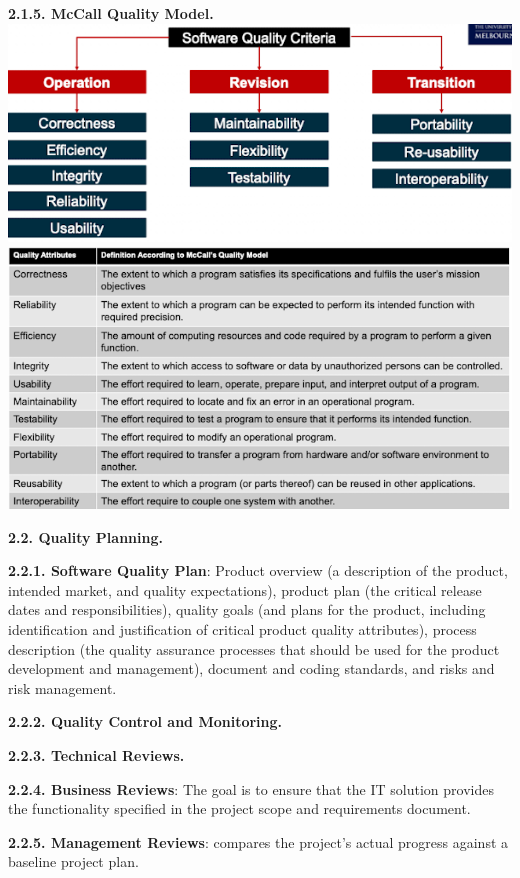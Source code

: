         \textbf{2.1.5. McCall Quality Model.}
        \includegraphics[width=\linewidth]{figs/SCR-20240606-orsk.png}
        \includegraphics[width=\linewidth]{figs/SCR-20240606-osms.png}

    \textbf{2.2. Quality Planning.}

        \textbf{2.2.1. Software Quality Plan}: Product overview (a description of the product, intended market, and quality expectations), product plan (the critical release dates and responsibilities), quality goals (and plans for the product, including identification and justification of critical product quality attributes), process description (the quality assurance processes that should be used for the product development and management), document and coding standards, and risks and risk management.

        \textbf{2.2.2. Quality Control and Monitoring.}

        \textbf{2.2.3. Technical Reviews.}

        \textbf{2.2.4. Business Reviews}: The goal is to ensure that the IT solution provides the functionality specified in the project scope and requirements document.

        \textbf{2.2.5. Management Reviews}: compares the project's actual progress against a baseline project plan.

